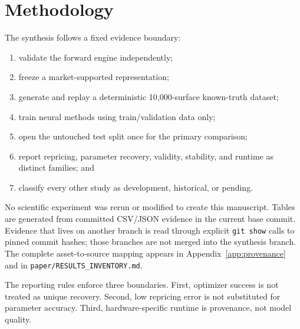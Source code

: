 \section{Methodology}
\label{sec:methodology}

The synthesis follows a fixed evidence boundary:
\begin{enumerate}
    \item validate the forward engine independently;
    \item freeze a market-supported representation;
    \item generate and replay a deterministic 10{,}000-surface known-truth dataset;
    \item train neural methods using train/validation data only;
    \item open the untouched test split once for the primary comparison;
    \item report repricing, parameter recovery, validity, stability, and runtime as
          distinct families; and
    \item classify every other study as development, historical, or pending.
\end{enumerate}

No scientific experiment was rerun or modified to create this manuscript. Tables are
generated from committed CSV/JSON evidence in the current base commit. Evidence that
lives on another branch is read through explicit \texttt{git show} calls to pinned
commit hashes; those branches are not merged into the synthesis branch. The complete
asset-to-source mapping appears in Appendix~\ref{app:provenance} and in
\texttt{paper/RESULTS\_INVENTORY.md}.

The reporting rules enforce three boundaries. First, optimizer success is not treated
as unique recovery. Second, low repricing error is not substituted for parameter
accuracy. Third, hardware-specific runtime is provenance, not model quality.

